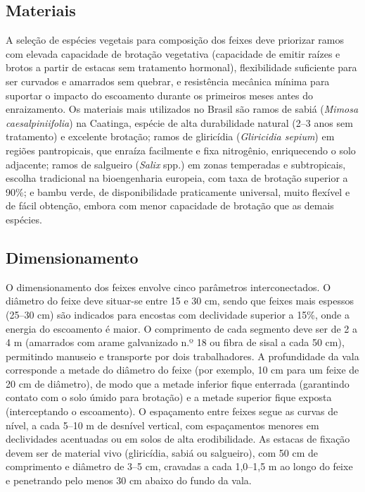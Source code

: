\documentclass[
  portuguese,
  11pt,
  a4paper,
  open=any]{scrbook}
\begin{document}
\subsection{Materiais}\label{materiais-1}

A seleção de espécies vegetais para composição dos feixes deve priorizar
ramos com elevada capacidade de brotação vegetativa (capacidade de
emitir raízes e brotos a partir de estacas sem tratamento hormonal),
flexibilidade suficiente para ser curvados e amarrados sem quebrar, e
resistência mecânica mínima para suportar o impacto do escoamento
durante os primeiros meses antes do enraizamento. Os materiais mais
utilizados no Brasil são ramos de sabiá (\emph{Mimosa caesalpiniifolia})
na Caatinga, espécie de alta durabilidade natural (2--3 anos sem
tratamento) e excelente brotação; ramos de gliricídia (\emph{Gliricidia
sepium}) em regiões pantropicais, que enraíza facilmente e fixa
nitrogênio, enriquecendo o solo adjacente; ramos de salgueiro
(\emph{Salix} spp.) em zonas temperadas e subtropicais, escolha
tradicional na bioengenharia europeia, com taxa de brotação superior a
90\%; e bambu verde, de disponibilidade praticamente universal, muito
flexível e de fácil obtenção, embora com menor capacidade de brotação
que as demais espécies.

\subsection{Dimensionamento}\label{dimensionamento-2}

O dimensionamento dos feixes envolve cinco parâmetros interconectados. O
diâmetro do feixe deve situar-se entre 15 e 30 cm, sendo que feixes mais
espessos (25--30 cm) são indicados para encostas com declividade
superior a 15\%, onde a energia do escoamento é maior. O comprimento de
cada segmento deve ser de 2 a 4 m (amarrados com arame galvanizado n.º
18 ou fibra de sisal a cada 50 cm), permitindo manuseio e transporte por
dois trabalhadores. A profundidade da vala corresponde a metade do
diâmetro do feixe (por exemplo, 10 cm para um feixe de 20 cm de
diâmetro), de modo que a metade inferior fique enterrada (garantindo
contato com o solo úmido para brotação) e a metade superior fique
exposta (interceptando o escoamento). O espaçamento entre feixes segue
as curvas de nível, a cada 5--10 m de desnível vertical, com
espaçamentos menores em declividades acentuadas ou em solos de alta
erodibilidade. As estacas de fixação devem ser de material vivo
(gliricídia, sabiá ou salgueiro), com 50 cm de comprimento e diâmetro de
3--5 cm, cravadas a cada 1,0--1,5 m ao longo do feixe e penetrando pelo
menos 30 cm abaixo do fundo da vala.
\end{document}
